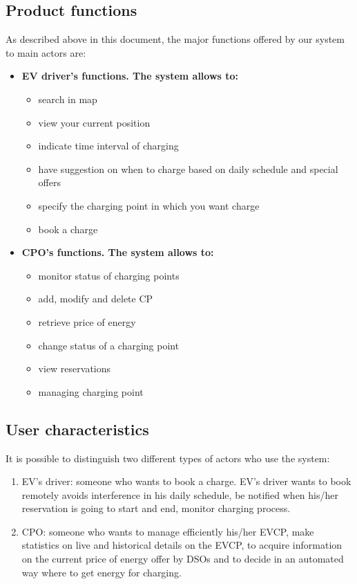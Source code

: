 \subsection{Product functions}
As described above in this document, the major functions offered by our system to main actors are:\\ 
\begin{itemize}
      \item \textbf{EV driver's functions. The system allows to:} 
      \begin{itemize}
            \item search in map
            \item view your current position
            \item indicate time interval of charging
            \item have suggestion on when to charge based on daily schedule and special offers
            \item specify the charging point in which you want charge  
            \item book a charge
      \end{itemize}
\end{itemize}
\begin{itemize}
      \item \textbf{CPO's functions. The system allows to:} 
      \begin{itemize}
            \item monitor status of charging points
            \item add, modify and delete CP
            \item retrieve price of energy
            \item change status of a charging point
            \item view reservations
            \item managing charging point
      \end{itemize}
\end{itemize}


\subsection{User characteristics}
It is possible to distinguish two different types of actors who use the system:
\begin{enumerate}
      \item EV's driver: someone who wants to book a charge. EV's driver wants to book remotely
avoids interference in his daily schedule, be notified when his/her reservation
is going to start and end, monitor charging process.
      \item CPO: someone who wants to manage efficiently his/her EVCP, make statistics on live and historical details on the EVCP, 
to acquire information on the current price of energy offer by DSOs and to decide in an automated way
where to get energy for charging.
\end{enumerate}


